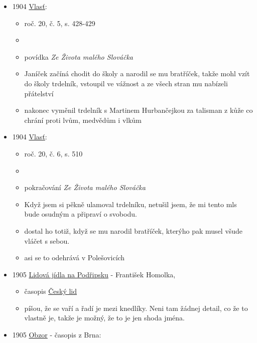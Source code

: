 \begin{itemize}
  \begin{itemize}
  \tightlist
  \item
    s. 679 - recept na trdlovec - stromovej dort, litej trdelník
  \item
    s. 726-730 - spousta receptů na vaječníky, ale všechno to jsou
    pokrmy z vajec smažený na pánvi
  \end{itemize}
\item
  1904
  \href{https://www.digitalniknihovna.cz/mzk/uuid/uuid:46bad410-fe09-11e8-8d10-5ef3fc9ae867}{Vlasť}:

  \begin{itemize}
  \tightlist
  \item
    roč. 20, č. 5, s. 428-429
  \item
  \item
    povídka \emph{Ze Života malého Slováčka}
  \item
    Janíček začíná chodit do školy a narodil se mu bratříček, takže mohl
    vzít do školy trdelník, vstoupil ve vážnost a ze všech stran mu
    nabízeli přátelství
  \item
    nakonec vyměnil trdelník s Martinem Hurbančejkou za talisman z kůže
    co chrání proti lvům, medvědům i vlkům
  \end{itemize}
\item
  1904
  \href{https://www.digitalniknihovna.cz/mzk/uuid/uuid:9ee0db90-fe08-11e8-8d10-5ef3fc9ae867}{Vlasť}:

  \begin{itemize}
  \tightlist
  \item
    roč. 20, č. 6, s. 510
  \item
  \item
    pokračování \emph{Ze Života malého Slováčka}
  \item
    Když jsem si pěkně ulamoval trdelníku, netušil jsem, že mi tento mls
    bude osudným a připraví o svobodu.
  \item
    dostal ho totiž, když se mu narodil bratříček, kterýho pak musel
    všude vláčet s sebou.
  \item
    asi se to odehrává v Polešovicích 
  \end{itemize}
\item
  1905 \href{https://www.jstor.org/stable/42693111}{Lidová jídla na
  Podřipsku} - František Homolka,

  \begin{itemize}
  \tightlist
  \item
    časopis
    \href{https://ceskadigitalniknihovna.cz/uuid/uuid:27984073-3c0d-48de-8c3a-9b56c8b34d7a}{Český
    lid}
  \item
    píšou, že se vaří a řadí je mezi knedlíky. Neni tam žádnej detail,
    co že to vlastně je, takže je možný, že to je jen shoda jména.
  \end{itemize}
\item
  1905
  \href{https://ceskadigitalniknihovna.cz/view/uuid:89c00f20-ac41-11dd-b6fd-000d606f5dc6?page=uuid\%3A2b67a058-6dd3-4a26-8b98-58bc2dd95f6a&fulltext=trdeln\%C3\%ADk\%20OR\%20trdeln\%C3\%ADky\%20OR\%20trdeln\%C3\%ADk\%C5\%AF&source=nkp}{Obzor}
  - časopis z Brna:


\end{itemize}
